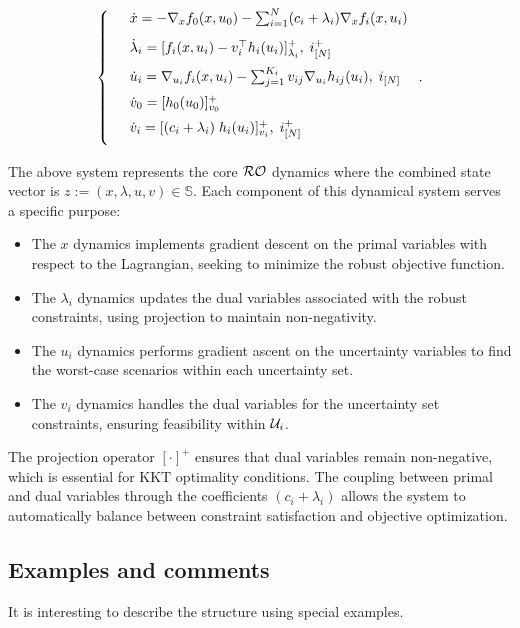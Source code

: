 \documentclass[journal,twoside,web]{ieeecolor}
\begin{document}
\begin{align} \label{pd_dynamics}
\left\{
\begin{array}{cl}
\vspace{3mm}
&\dot x=-\nabla_x f_0(x,u_0)-  \sum_{i=1}^N(c_i+\lambda_i) \nabla_x f_i(x,u_i)\\
\vspace{2mm}
&\dot \lambda_i=[f_i(x,u_i)-v_i^\top h_i(u_i)]_{\lambda_i}^+,\; i^+_{[N]}\\
\vspace{2mm}
&\dot u_i=\nabla_{u_i}f_i(x,u_i)-  \sum_{j=1}^{K_i} v_{ij} \nabla_{u_i} h_{ij}(u_i),\; i_{[N]}\\
\vspace{2mm}
&\dot{v}_0=[h_0(u_0)]_{v_0}^+\\
\vspace{2mm}
&\dot v_i=[(c_i+\lambda_i) \; h_i(u_i)]_{v_i}^+,\;i^+_{[N]}
\end{array}\right..
\end{align}

{\color{blue} The above system represents the core ${\cal RO}$ dynamics where the combined state vector is $z:=(x,\lambda,u,v) \in \mathbb{S}$. Each component of this dynamical system serves a specific purpose:

\begin{itemize}
\item The $x$ dynamics implements gradient descent on the primal variables with respect to the Lagrangian, seeking to minimize the robust objective function.
\item The $\lambda_i$ dynamics updates the dual variables associated with the robust constraints, using projection to maintain non-negativity.
\item The $u_i$ dynamics performs gradient ascent on the uncertainty variables to find the worst-case scenarios within each uncertainty set.
\item The $v_i$ dynamics handles the dual variables for the uncertainty set constraints, ensuring feasibility within ${\cal U}_i$.
\end{itemize}

The projection operator $[\cdot]^+$ ensures that dual variables remain non-negative, which is essential for KKT optimality conditions. The coupling between primal and dual variables through the coefficients $(c_i+\lambda_i)$ allows the system to automatically balance between constraint satisfaction and objective optimization.}

\subsection{Examples and comments} \label{examples_and_comments}
It is interesting to describe the structure using special examples.
\end{document}
